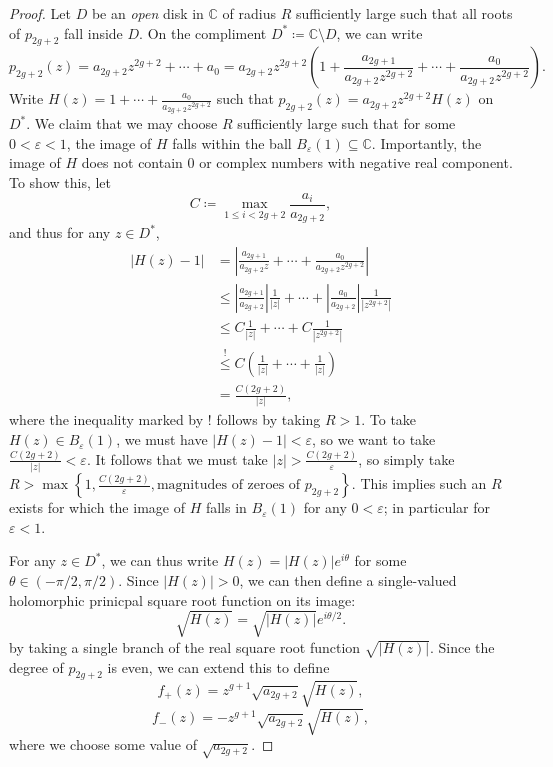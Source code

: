 \documentclass[11pt, letterpaper]{article}
\theoremstyle{plain}
\begin{document}
\begin{proof}
	Let $D$ be an \emph{open} disk in $\mathbb{C} $ of radius $R$ sufficiently large such that all roots of $p_{2g+2} $ fall inside $D$. On the compliment $D^* \coloneqq \mathbb{C} \setminus D$, we can write
	\[
		p_{2g+2} (z) = a_{2g+2} z^{2g+2} +\cdots +a_0 = a_{2g+2} z^{2g+2} \left( 1+ \frac{a_{2g+1} }{a_{2g+2} z^{2g+2} } +\cdots +\frac{a_0}{a_{2g+2} z^{2g+2} }  \right) 
	.\]
	Write $H(z) = 1 + \cdots + \frac{a_0}{a_{2g+2} z^{2g+2} } $ such that $p_{2g+2} (z) = a_{2g+2} z^{2g+2} H(z)$ on $D^*$. We claim that we may choose $R$ sufficiently large such that for some $0<\varepsilon <1$, the image of $H$ falls within the ball $B_\varepsilon (1)\subseteq \mathbb{C} $. Importantly, the image of $H$ does not contain 0 or complex numbers with negative real component. To show this, let
	\[
		C\coloneqq \max_{1\leq i < 2g+2} \frac{a_i}{a_{2g+2} } ,
	\]
	and thus for any $z\in D^*$,
	\begin{align*}
		\left| H(z) - 1 \right| &= \left| \frac{a_{2g+1} }{a_{2g+2} z}+\cdots +\frac{a_0}{a_{2g+2} z^{2g+2} }   \right| \\
					&\leq \left| \frac{a_{2g+1} }{a_{2g+2} }  \right| \frac{1}{\left| z \right| } +\cdots +\left| \frac{a_0}{a_{2g+2} }  \right| \frac{1}{\left| z^{2g+2}  \right| } \\
					&\leq C\frac{1}{\left| z \right| } +\cdots +C\frac{1}{\left| z^{2g+2}  \right| } \\
					&\overset{!}{\leq }C\left( \frac{1}{\left| z \right|} +\cdots +\frac{1}{\left| z \right| }  \right) \\
					&=\frac{C(2g+2)}{\left| z \right| } ,
	\end{align*}
	where the inequality marked by $!$ follows by taking $R>1$. To take $H(z)\in B_\varepsilon (1)$, we must have $\left| H(z)-1 \right|<\varepsilon $, so we want to take $\frac{C(2g+2)}{\left| z \right| } <\varepsilon $. It follows that we must take $\left| z \right| > \frac{C(2g+2)}{\varepsilon } $, so simply take $R > \max \left\{ 1,\frac{C(2g+2)}{\varepsilon } ,\text{magnitudes of zeroes of } p_{2g+2}  \right\} $. This implies such an $R$ exists for which the image of $H$ falls in $B_\varepsilon (1)$ for any $0 < \varepsilon $; in particular for $\varepsilon <1$.

	For any $z\in D^*$, we can thus write $H(z) = \left| H(z) \right| e^{i\theta } $ for some $\theta \in (-\pi/2,\pi/2)$. Since $\left| H(z) \right| >0$, we can then define a single-valued holomorphic prinicpal square root function on its image:
	\[
		\sqrt{H(z)} =\sqrt{\left| H(z) \right| } e^{i\theta /2} 
	.\]
	by taking a single branch of the real square root function $\sqrt{\left| H(z) \right| } $. Since the degree of $p_{2g+2} $ is even, we can extend this to define
	\[
		f_+(z) = z^{g+1} \sqrt{a_{2g+2} } \sqrt{H(z)} ,
	\]
	\[
		f_-(z) = -z^{g+1} \sqrt{a_{2g+2} } \sqrt{H(z)} 
	,\]
	where we choose some value of $\sqrt{a_{2g+2} } $.


\end{proof}
\end{document}

